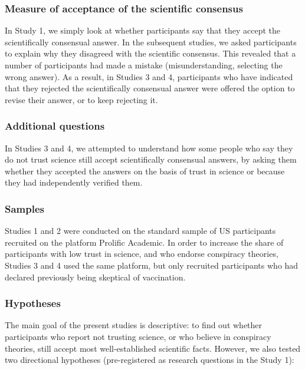\documentclass[
  doc,floatsintext]{apa6}
\begin{document}
\subsubsection{Measure of acceptance of the scientific consensus}\label{measure-of-acceptance-of-the-scientific-consensus}

In Study 1, we simply look at whether participants say that they accept the scientifically consensual answer. In the subsequent studies, we asked participants to explain why they disagreed with the scientific consensus. This revealed that a number of participants had made a mistake (misunderstanding, selecting the wrong answer). As a result, in Studies 3 and 4, participants who have indicated that they rejected the scientifically consensual answer were offered the option to revise their answer, or to keep rejecting it.

\subsubsection{Additional questions}\label{additional-questions}

In Studies 3 and 4, we attempted to understand how some people who say they do not trust science still accept scientifically consensual answers, by asking them whether they accepted the answers on the basis of trust in science or because they had independently verified them.

\subsubsection{Samples}\label{samples}

Studies 1 and 2 were conducted on the standard sample of US participants recruited on the platform Prolific Academic. In order to increase the share of participants with low trust in science, and who endorse conspiracy theories, Studies 3 and 4 used the same platform, but only recruited participants who had declared previously being skeptical of vaccination.

\subsubsection{Hypotheses}\label{hypotheses}

The main goal of the present studies is descriptive: to find out whether participants who report not trusting science, or who believe in conspiracy theories, still accept most well-established scientific facts. However, we also tested two directional hypotheses (pre-registered as research questions in the Study 1):
\end{document}
